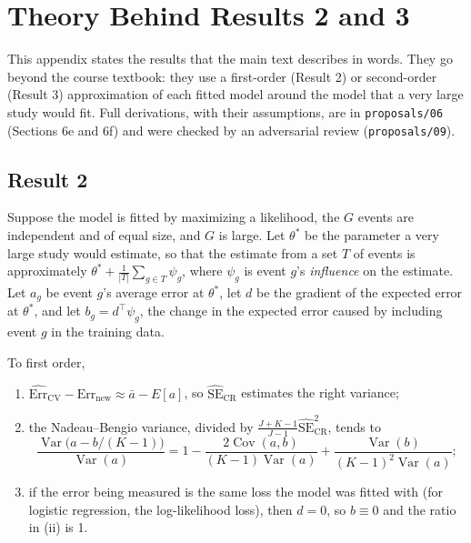 
\section{Theory Behind Results 2 and 3}
\label{app:theory}

This appendix states the results that the main text describes in words. They go beyond the course textbook: they use
a first-order (Result 2) or second-order (Result 3) approximation of each fitted model around the model that a very
large study would fit. Full derivations, with their assumptions, are in \texttt{proposals/06} (Sections 6e and 6f)
and were checked by an adversarial review (\texttt{proposals/09}).

\subsection{Result 2}

Suppose the model is fitted by maximizing a likelihood, the $G$ events are independent and of equal size, and $G$ is
large. Let $\theta^*$ be the parameter a very large study would estimate, so that the estimate from a set $T$ of events
is approximately $\theta^*+\frac{1}{|T|}\sum_{g\in T}\psi_g$, where $\psi_g$ is event $g$'s \emph{influence} on the estimate. Let $a_g$ be
event $g$'s average error at $\theta^*$, let $d$ be the gradient of the expected error at $\theta^*$, and let $b_g=d^\top\psi_g$, the
change in the expected error caused by including event $g$ in the training data.

\begin{prop}\label{prop:first-formal}
To first order,
\begin{enumerate}
\item[(i)] $\widehat{\mathrm{Err}}_{\mathrm{CV}}-\mathrm{Err}_{\mathrm{new}}\approx\bar a-E[a]$, so $\widehat{\mathrm{SE}}_{\mathrm{CR}}$ estimates the right variance;
\item[(ii)] the Nadeau--Bengio variance, divided by $\frac{J+K-1}{J-1}\widehat{\mathrm{SE}}_{\mathrm{CR}}^2$, tends to
\[
\frac{\operatorname{Var}\big(a-b/(K-1)\big)}{\operatorname{Var}(a)}=1-\frac{2\operatorname{Cov}(a,b)}{(K-1)\operatorname{Var}(a)}+\frac{\operatorname{Var}(b)}{(K-1)^2\operatorname{Var}(a)};
\]
\item[(iii)] if the error being measured is the same loss the model was fitted with (for logistic regression, the
log-likelihood loss), then $d=0$, so $b\equiv0$ and the ratio in (ii) is 1.
\end{enumerate}
\end{prop}

